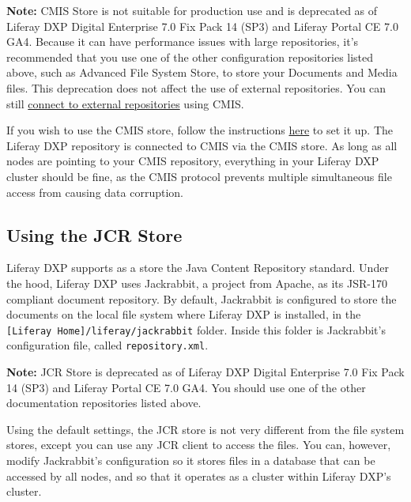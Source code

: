 \noindent\hrulefill

\textbf{Note:} CMIS Store is not suitable for production use and is
deprecated as of Liferay DXP Digital Enterprise 7.0 Fix Pack 14 (SP3)
and Liferay Portal CE 7.0 GA4. Because it can have performance issues
with large repositories, it's recommended that you use one of the other
configuration repositories listed above, such as Advanced File System
Store, to store your Documents and Media files. This deprecation does
not affect the use of external repositories. You can still
\href{/docs/7-0/user/-/knowledge_base/u/using-external-repositories}{connect
to external repositories} using CMIS.

\noindent\hrulefill

If you wish to use the CMIS store, follow the instructions
\href{/docs/7-0/deploy/-/knowledge_base/d/document-repository-configuration\#cmis-store}{here}
to set it up. The Liferay DXP repository is connected to CMIS via the
CMIS store. As long as all nodes are pointing to your CMIS repository,
everything in your Liferay DXP cluster should be fine, as the CMIS
protocol prevents multiple simultaneous file access from causing data
corruption.

\subsection{Using the JCR Store}\label{using-the-jcr-store}

Liferay DXP supports as a store the Java Content Repository standard.
Under the hood, Liferay DXP uses Jackrabbit, a project from Apache, as
its JSR-170 compliant document repository. By default, Jackrabbit is
configured to store the documents on the local file system where Liferay
DXP is installed, in the \texttt{{[}Liferay\ Home{]}/liferay/jackrabbit}
folder. Inside this folder is Jackrabbit's configuration file, called
\texttt{repository.xml}.

\noindent\hrulefill

\textbf{Note:} JCR Store is deprecated as of Liferay DXP Digital
Enterprise 7.0 Fix Pack 14 (SP3) and Liferay Portal CE 7.0 GA4. You
should use one of the other documentation repositories listed above.

\noindent\hrulefill

Using the default settings, the JCR store is not very different from the
file system stores, except you can use any JCR client to access the
files. You can, however, modify Jackrabbit's configuration so it stores
files in a database that can be accessed by all nodes, and so that it
operates as a cluster within Liferay DXP's cluster.

